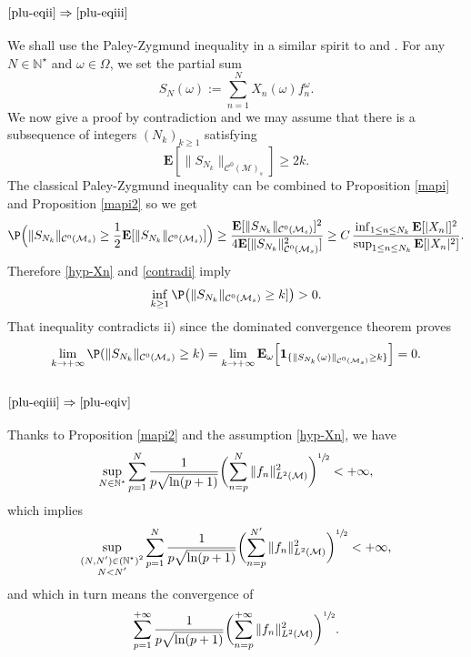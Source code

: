 \documentclass[10pt]{amsart}
\theoremstyle{theorem}
\theoremstyle{definition}
\newcommand\E{\mathbf{E}}
\newcommand\N{\mathbb{N}}
\newcommand\CC{\mathcal{C}}
\newcommand\pun{\mathbf{1}}
\begin{document}
\subsubsection*{$\eqref{plu-eqii}\Rightarrow\eqref{plu-eqiii}$}
We shall use the Paley-Zygmund inequality in a similar spirit to
\cite[p.\,55, Lem.\,1.2]{pisier1981} and \cite[Prop.\,2.17]{imek-crusep}. For any $N\in \N^\star$ and $\omega\in \Omega$, we set the partial sum
\begin{equation*}
S_N(\omega):=\sum_{n=1}^N X_n(\omega) f_n^{\omega}.
\end{equation*}
We now give a proof by contradiction and we may assume that there is a subsequence of integers $(N_k)_{k\geq 1}$ satisfying
\begin{equation}\label{contradi}
\E[\|S_{N_k}\|_{\CC^0(\mathcal{M})_s}]\geq 2k.
\end{equation}
The classical Paley-Zygmund inequality \cite[p.\,8, Ineq.\,II]{kahane} can be combined to Proposition \ref{mapi} and Proposition \ref{mapi2} so we get
\begin{equation*}
\P\Big(\|S_{N_k}\|_{\CC^0(\mathcal{M}_s)} \geq \frac{1}{2} \E[\|S_{N_k}\|_{\CC^0(\mathcal{M}_s)}]\Big)\geq \frac{\E[\|S_{N_k}\|_{\CC^0(\mathcal{M}_s)}]^2}{4
\E[\|S_{N_k}\|_{\CC^0(\mathcal{M}_s)}^2]} \geq C\,\frac{\inf_{1\leq n\leq N_k}\E[|X_n|]^2}{\sup_{1\leq n \leq N_k} \E[|X_n|^2] }.
\end{equation*}
Therefore \eqref{hyp-Xn} and \eqref{contradi} imply
\begin{equation*}
\inf_{k\geq 1} \P\bigl(\|S_{N_k}\|_{\CC^0(\mathcal{M}_s)} \geq k]\bigr)>0.
\end{equation*}
That inequality contradicts ii) since the dominated convergence theorem proves
\begin{equation*}
\lim_{k\to +\infty} \P(\|S_{N_k} \|_{\CC^0(\mathcal{M}_s)}\geq k)=\lim_{k\to +\infty} \E_{\omega}\Big[\pun_{\{\|S_{N_k}(\omega) \|_{\CC^0(\mathcal{M}_s)}\geq k\}}\Big]=0.
\end{equation*}

\subsubsection*{$\eqref{plu-eqiii}\Rightarrow\eqref{plu-eqiv}$}
Thanks to Proposition \ref{mapi2} and the assumption \eqref{hyp-Xn}, we have
\begin{equation*}
\sup_{N\in \N^\star} \sum_{p=1}^N \frac{1}{p\sqrt{\ln(p+1)}} \biggl(\sum_{n=p}^{N} \|f_n\|_{L^2(\mathcal{M})}^2 \biggr)^{\sfrac{1}{2}}<+\infty,
\end{equation*}
which implies
\begin{equation*}
\sup_{\substack{(N,N')\in (\N^\star)^2 \\ N<N' }} \sum_{p=1}^{N} \frac{1}{p\sqrt{\ln(p+1)}} \biggl(\sum_{n=p}^{N'} \|f_n\|_{L^2(\mathcal{M})}^2 \biggr)^{\sfrac{1}{2}} <+\infty,
\end{equation*}
and which in turn means the convergence of
\[
\sum_{p=1}^{+\infty} \frac{1}{p\sqrt{\ln(p+1)}} \biggl(\sum_{n=p}^{+\infty} \|f_n\|_{L^2(\mathcal{M})}^2 \biggr)^{\sfrac{1}{2}}.
\]
\end{document}
